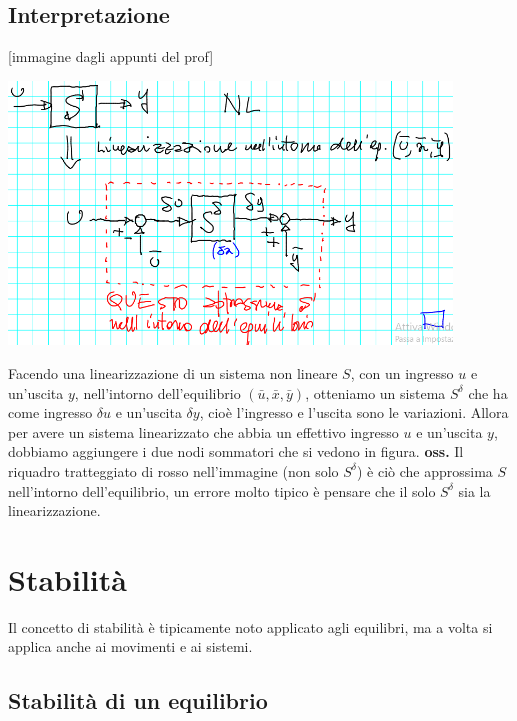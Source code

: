 \subsection{Interpretazione}
[immagine dagli appunti del prof]
\begin{center}
    \includegraphics[height=7cm]{../lezione4/img1.PNG}
\end{center}
Facendo una linearizzazione di un sistema non lineare $S$, con un ingresso $u$ e un'uscita $y$, nell'intorno dell'equilibrio $(\bar{u}, \bar{x},\bar{y})$, otteniamo un sistema $S^\delta$ che ha come ingresso $\delta u$ e un'uscita $\delta y$, cioè l'ingresso e l'uscita sono le variazioni. Allora per avere un sistema linearizzato che abbia un effettivo ingresso $u$ e un'uscita $y$, dobbiamo aggiungere i due nodi sommatori che si vedono in figura.\newline
\newline
\textbf{oss.} Il riquadro tratteggiato di rosso nell'immagine (non solo $S^\delta$) è ciò che approssima $S$ nell'intorno dell'equilibrio, un errore molto tipico è pensare che il solo $S^\delta$ sia la linearizzazione.
\newpage
\section{Stabilità}
Il concetto di stabilità è tipicamente noto applicato agli equilibri, ma a volta si applica anche ai movimenti e ai sistemi.
\subsection{Stabilità di un equilibrio}
